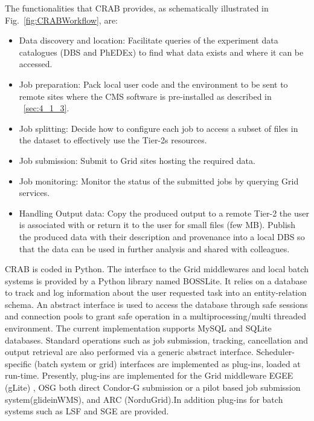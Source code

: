 The functionalities that CRAB provides, as schematically illustrated in Fig.~\ref{fig:CRABWorkflow}, are:
\begin{itemize}
\item{Data discovery and location:}
Facilitate queries of the experiment data catalogues (DBS and PhEDEx) to find 
what data exists and where it can be accessed.
\item{Job preparation:}
Pack local user code and the environment to be sent to remote sites where the CMS software is pre-installed as described in ~\ref{sec:4_1_3}.
\item{Job splitting:}
Decide how to configure each job to access a subset of files in the dataset to effectively use the Tier-2s resources.
\item{Job submission:}
Submit to Grid sites hosting the required data.
\item{Job monitoring:}
Monitor the status of the submitted jobs by querying Grid services.
\item{Handling Output data:}
Copy the produced output to a remote Tier-2 the user is associated with or return it to the user for small files (few MB).
Publish the produced data with their description and provenance into a local DBS so that the data can be used in further analysis and shared with colleagues.
\end{itemize} 

CRAB is coded in Python. The interface to the Grid middlewares and local batch systems is provided by a Python library named BOSSLite\cite{RefBOSSLite}. It relies on a database to track and log information about the user requested task into an entity-relation schema.
An abstract interface is used to access the database through safe sessions and connection pools to grant safe operation in a multiprocessing/multi threaded environment. The current implementation supports MySQL and SQLite databases.
Standard operations such as job submission, tracking, cancellation and output retrieval are also performed via a generic abstract interface. Scheduler-specific (batch system or grid) interfaces are implemented as plug-ins, loaded at run-time. Presently, plug-ins are implemented for the Grid middleware EGEE (gLite) \cite{RefgLiteWMS}, OSG \cite{RefOSG} both direct Condor-G submission or a pilot based job submission system(glideinWMS\cite{Refglidein}), and ARC (NorduGrid)\cite{RefARC}.In addition plug-ins for batch systems such as LSF and SGE are provided.

